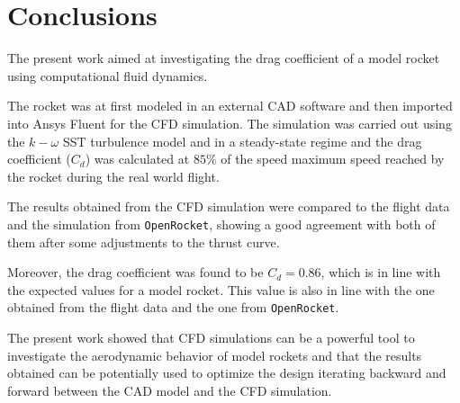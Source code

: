 \section{Conclusions}
\label{sec:conclusions}

The present work aimed at investigating the drag coefficient of a model rocket using computational fluid dynamics.

The rocket was at first modeled in an external CAD software and then imported into Ansys Fluent for the CFD simulation.
The simulation was carried out using the $k-\omega$ SST turbulence model and in a steady-state regime and the drag coefficient ($C_d$) was calculated at $85\%$ of the speed maximum speed reached by the rocket during the real world flight.

The results obtained from the CFD simulation were compared to the flight data and the simulation from \texttt{OpenRocket}, showing a good agreement with both of them after some adjustments to the thrust curve.

Moreover, the drag coefficient was found to be $C_d = 0.86$, which is in line with the expected values for a model rocket.
This value is also in line with the one obtained from the flight data and the one from \texttt{OpenRocket}.

The present work showed that CFD simulations can be a powerful tool to investigate the aerodynamic behavior of model rockets and that the results obtained can be potentially used to optimize the design iterating backward and forward between the CAD model and the CFD simulation.